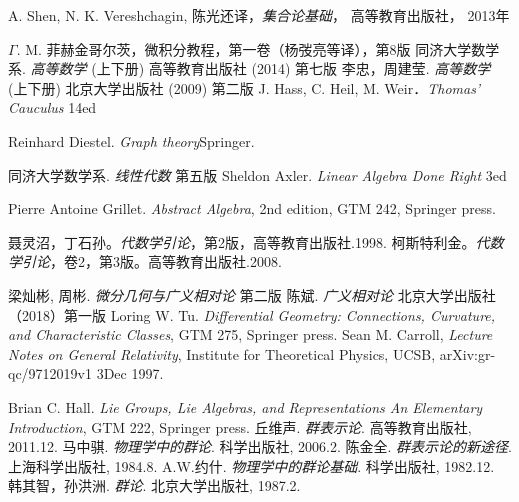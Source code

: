 
\begin{thebibliography}{99}

A. Shen, N. K. Vereshchagin, 陈光还译，\textsl{集合论基础}， 高等教育出版社， 2013年

$\Gamma$. M. 菲赫金哥尔茨，微积分教程，第一卷（杨弢亮等译），第8版
同济大学数学系. \textsl{高等数学} (上下册) 高等教育出版社 (2014) 第七版
李忠，周建莹. \textsl{高等数学} (上下册) 北京大学出版社 (2009) 第二版
J. Hass, C. Heil, M. Weir．\textsl{Thomas' Cauculus} 14ed

Reinhard Diestel. \textsl{Graph theory}Springer.

同济大学数学系. \textsl{线性代数} 第五版
Sheldon Axler. \textsl{Linear Algebra Done Right} 3ed

Pierre Antoine Grillet. \textsl{Abstract Algebra}, 2nd edition, GTM 242, Springer press. 

聂灵沼，丁石孙。\textsl{代数学引论}，第2版，高等教育出版社.1998.
柯斯特利金。\textsl{代数学引论}，卷2，第3版。高等教育出版社.2008.

梁灿彬, 周彬. \textsl{微分几何与广义相对论} 第二版
陈斌. \textsl{广义相对论} 北京大学出版社（2018）第一版
Loring W. Tu. \textsl{Differential Geometry: Connections, Curvature, and Characteristic Classes}, GTM 275, Springer press. 
Sean M. Carroll, \textsl{Lecture Notes on General Relativity}, Institute for Theoretical Physics, UCSB, arXiv:gr-qc/9712019v1 3Dec 1997. 

Brian C. Hall. \textsl{Lie Groups, Lie Algebras, and Representations An Elementary Introduction}, GTM 222, Springer press. 
丘维声. \textsl{群表示论}. 高等教育出版社, 2011.12.
马中骐. \textsl{物理学中的群论}. 科学出版社, 2006.2.
陈金全. \textsl{群表示论的新途径}. 上海科学出版社, 1984.8.
A.W.约什. \textsl{物理学中的群论基础}. 科学出版社, 1982.12.
韩其智，孙洪洲. \textsl{群论}. 北京大学出版社, 1987.2.


\end{thebibliography}
